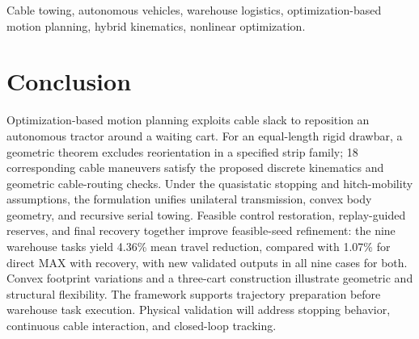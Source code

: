 \documentclass[10pt,journal,twoside]{IEEEtran}
\begin{document}
\vspace{\baselineskip}
\begin{IEEEkeywords}
Cable towing, autonomous vehicles, warehouse logistics, optimization-based motion planning, hybrid kinematics, nonlinear optimization.
\end{IEEEkeywords}





\FloatBarrier
\section{Conclusion}
Optimization-based motion planning exploits cable slack to reposition an autonomous tractor around a waiting cart. For an equal-length rigid drawbar, a geometric theorem excludes reorientation in a specified strip family; 18 corresponding cable maneuvers satisfy the proposed discrete kinematics and geometric cable-routing checks. Under the quasistatic stopping and hitch-mobility assumptions, the formulation unifies unilateral transmission, convex body geometry, and recursive serial towing. Feasible control restoration, replay-guided reserves, and final recovery together improve feasible-seed refinement: the nine warehouse tasks yield 4.36\% mean travel reduction, compared with 1.07\% for direct MAX with recovery, with new validated outputs in all nine cases for both. Convex footprint variations and a three-cart construction illustrate geometric and structural flexibility. The framework supports trajectory preparation before warehouse task execution. Physical validation will address stopping behavior, continuous cable interaction, and closed-loop tracking.


\end{document}
